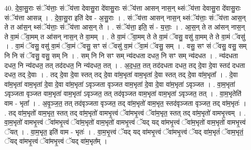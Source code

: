\documentclass[17pt]{extarticle}
\begin{document}
40. दे॒वा॒सु॒राः संॅय॑त्ताः॒ संॅय॑त्ता देवासु॒रा दे॑वासु॒राः संॅय॑त्ता आसन् नास॒न् थ्संॅय॑त्ता देवासु॒रा दे॑वासु॒राः संॅय॑त्ता आसन्न् । . दे॒वा॒सु॒रा इति॑ देव - अ॒सु॒राः । . संॅय॑त्ता आसन् नास॒न् थ्संॅय॑त्ताः॒ संॅय॑त्ता आस॒न् ते त आ॑स॒न् थ्संॅय॑त्ताः॒ संॅय॑त्ता आस॒न् ते । . संॅय॑त्ता॒ इति॒ सं - य॒त्ताः॒ । . आ॒स॒न् ते त आ॑सन् नास॒न् ते वा॒मं ॅवा॒मम् त आ॑सन् नास॒न् ते वा॒मम् । . ते वा॒मं ॅवा॒मम् ते ते वा॒मं ॅवसु॒ वसु॑ वा॒मम् ते ते वा॒मं ॅवसु॑ । . वा॒मं ॅवसु॒ वसु॑ वा॒मं ॅवा॒मं ॅवसु॒ सꣳ सं ॅवसु॑ वा॒मं ॅवा॒मं ॅवसु॒ सम् । . वसु॒ सꣳ सं ॅवसु॒ वसु॒ सम् नि नि सं ॅवसु॒ वसु॒ सम् नि । . सम् नि नि सꣳ सम् न्य॑दधता दधत॒ नि सꣳ सम् न्य॑दधत । . न्य॑दधता दधत॒ नि न्य॑दधत॒ तत् तद॑दधत॒ नि न्य॑दधत॒ तत् । . अ॒द॒ध॒त॒ तत् तद॑दधता दधत॒ तद् दे॒वा दे॒वा स्तद॑ दधता दधत॒ तद् दे॒वाः । . तद् दे॒वा दे॒वा स्तत् तद् दे॒वा वा॑म॒भृता॑ वाम॒भृता॑ दे॒वा स्तत् तद् दे॒वा वा॑म॒भृता᳚ । . दे॒वा वा॑म॒भृता॑ वाम॒भृता॑ दे॒वा दे॒वा वा॑म॒भृता॑ ऽवृञ्जता वृञ्जत वाम॒भृता॑ दे॒वा दे॒वा वा॑म॒भृता॑ ऽवृञ्जत । . वा॒म॒भृता॑ ऽवृञ्जता वृञ्जत वाम॒भृता॑ वाम॒भृता॑ ऽवृञ्जत॒ तत् तद॑वृञ्जत वाम॒भृता॑ वाम॒भृता॑ ऽवृञ्जत॒ तत् । . वा॒म॒भृतेति॑ वाम - भृता᳚ । . अ॒वृ॒ञ्ज॒त॒ तत् तद॑वृञ्जता वृञ्जत॒ तद् वा॑म॒भृतो॑ वाम॒भृत॒ स्तद॑वृञ्जता वृञ्जत॒ तद् वा॑म॒भृतः॑ । . तद् वा॑म॒भृतो॑ वाम॒भृत॒ स्तत् तद् वा॑म॒भृतो॑ वामभृ॒त्त्वं ॅवा॑मभृ॒त्त्वं ॅवा॑म॒भृत॒ स्तत् तद् वा॑म॒भृतो॑ वामभृ॒त्त्वम् । . वा॒म॒भृतो॑ वामभृ॒त्त्वं ॅवा॑मभृ॒त्त्वं ॅवा॑म॒भृतो॑ वाम॒भृतो॑ वामभृ॒त्त्वं ॅयद् यद् वा॑मभृ॒त्त्वं ॅवा॑म॒भृतो॑ वाम॒भृतो॑ वामभृ॒त्त्वं ॅयत् । . वा॒म॒भृत॒ इति॑ वाम - भृतः॑ । . वा॒म॒भृ॒त्त्वं ॅयद् यद् वा॑मभृ॒त्त्वं ॅवा॑मभृ॒त्त्वं ॅयद् वा॑म॒भृतं॑ ॅवाम॒भृतं॒ ॅयद् वा॑मभृ॒त्त्वं ॅवा॑मभृ॒त्त्वं ॅयद् वा॑म॒भृत᳚म् । \newline
\end{document}
